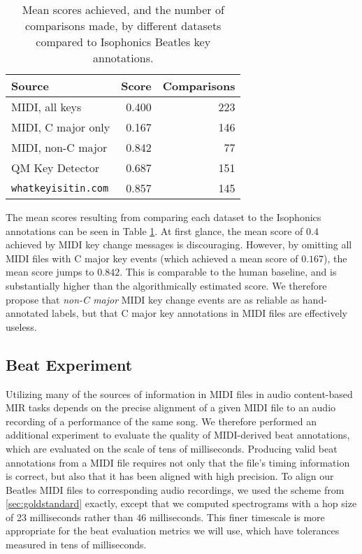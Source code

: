 \begin{table}
\begin{center}
\begin{tabular}{lrr}
  \toprule
  Source                     & Score & Comparisons \\
  \midrule
  MIDI, all keys             & 0.400 &         223 \\
  MIDI, C major only         & 0.167 &         146 \\
  MIDI, non-C major          & 0.842 &          77 \\
  QM Key Detector            & 0.687 &         151 \\
  \texttt{whatkeyisitin.com} & 0.857 &         145 \\
  \bottomrule
\end{tabular}
\end{center}
  \caption{Mean scores achieved, and the number of comparisons made, by different datasets compared to Isophonics Beatles key annotations.}
  \label{tab:key}
\end{table}

The mean scores resulting from comparing each dataset to the Isophonics annotations can be seen in Table \ref{tab:key}.
At first glance, the mean score of $0.4$ achieved by MIDI key change messages is discouraging.
However, by omitting all MIDI files with C major key events (which achieved a mean score of $0.167$), the mean score jumps to $0.842$.
This is comparable to the human baseline, and is substantially higher than the algorithmically estimated score.
We therefore propose that \textit{non-C major} MIDI key change events are as reliable as hand-annotated labels, but that C major key annotations in MIDI files are effectively useless.

\subsection{Beat Experiment}

Utilizing many of the sources of information in MIDI files in audio content-based MIR tasks depends on the precise alignment of a given MIDI file to an audio recording of a performance of the same song.
We therefore performed an additional experiment to evaluate the quality of MIDI-derived beat annotations, which are evaluated on the scale of tens of milliseconds.
Producing valid beat annotations from a MIDI file requires not only that the file's timing information is correct, but also that it has been aligned with high precision.
To align our Beatles MIDI files to corresponding audio recordings, we used the scheme from \cref{sec:goldstandard} exactly, except that we computed spectrograms with a hop size of 23 milliseconds rather than 46 milliseconds.
This finer timescale is more appropriate for the beat evaluation metrics we will use, which have tolerances measured in tens of milliseconds.

